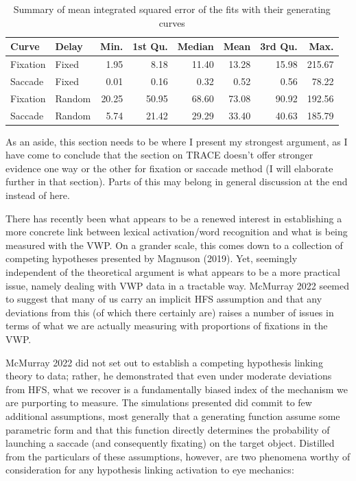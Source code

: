 \documentclass{article}
\begin{document}
\begin{table}[ht]
\centering
\begin{tabular}{llrrrrrr}
  \hline
Curve & Delay & Min. & 1st Qu. & Median & Mean & 3rd Qu. & Max. \\ 
  \hline
Fixation & Fixed & 1.95 & 8.18 & 11.40 & 13.28 & 15.98 & 215.67 \\ 
  Saccade & Fixed & 0.01 & 0.16 & 0.32 & 0.52 & 0.56 & 78.22 \\ 
  Fixation & Random & 20.25 & 50.95 & 68.60 & 73.08 & 90.92 & 192.56 \\ 
  Saccade & Random & 5.74 & 21.42 & 29.29 & 33.40 & 40.63 & 185.79 \\ 
   \hline
\end{tabular}
\caption{Summary of mean integrated squared error of the fits with their generating curves}
\label{tab:mise_fixed_delay}
\end{table}

As an aside, this section needs to be where I present my strongest argument, as I have come to conclude that the section on TRACE doesn't offer stronger evidence one way or the other for fixation or saccade method (I will elaborate further in that section). Parts of this may belong in general discussion at the end instead of here.

There has recently been what appears to be a renewed interest in establishing a more concrete link between lexical activation/word recognition and what is being measured with the VWP. On a grander scale, this comes down to a collection of competing hypotheses presented by Magnuson (2019). Yet, seemingly independent of the theoretical argument is what appears to be a more practical issue, namely dealing with VWP data in a tractable way. McMurray 2022 seemed to suggest that many of us carry an implicit HFS assumption and that any deviations from this (of which there certainly are) raises a number of issues in terms of what we are actually measuring with proportions of fixations in the VWP.

McMurray 2022 did not set out to establish a competing hypothesis linking theory to data; rather, he demonstrated that even under moderate deviations from HFS, what we recover is a fundamentally biased index of the mechanism we are purporting to measure. The simulations presented did commit to few additional assumptions, most generally that a generating function assume some parametric form and that this function directly determines the probability of launching a saccade (and consequently fixating) on the target object. Distilled from the particulars of these assumptions, however, are two phenomena worthy of consideration for any hypothesis linking activation to eye mechanics:
\end{document}

